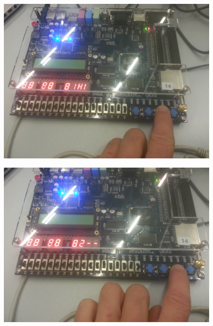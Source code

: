 \begin{enumerate}
		\begin{figure}[h]
			\centering
			\includegraphics[scale=0.8]{pictures/Oevelse5/opg3/guess_2p_try_hi.JPG}
			\caption{}
			\label{fig:Guess2pTryHi}
		\end{figure}
		\begin{figure}[h]
			\centering
			\includegraphics[scale=0.8]{pictures/Oevelse5/opg3/guess_2p_try_ok.JPG}
			\caption{}
			\label{fig:Guess2pTryOk}
		\end{figure}
		\begin{figure}[h]
			\centering

\end{figure}
\end{enumerate}

